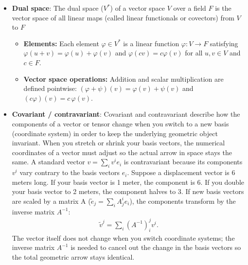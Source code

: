\documentclass{report}
\begin{document}
\begin{itemize}
            \[
                g'_{11}=g(2\mathbf e_1,2\mathbf e_1)=4g_{11}.
            \]
            The order counts the slots, and the dimension tells you how many choices each slot has. So an order-2 tensor has \(2^2=4\) entries in 2D and \(3^2=9\) entries in 3D.
        \item \textbf{Dual space}: The dual space (\(V^{*}\)) of a vector space \(V\) over a field \(F\) is the vector space of all linear maps (called linear functionals or covectors) from \(V\) to \(F\)
            \begin{itemize}
                \item \textbf{Elements:} Each element \(\varphi \in V^*\) is a linear function \(\varphi: V \to F\) satisfying \(\varphi(u + v) = \varphi(u) + \varphi(v)\) and \(\varphi(c v) = c \varphi(v)\) for all \(u, v \in V\) and \(c \in F\).
                \item \textbf{Vector space operations:} Addition and scalar multiplication are defined pointwise: \((\varphi + \psi)(v) = \varphi(v) + \psi(v)\) and \((c\varphi)(v) = c\,\varphi(v)\).
            \end{itemize}
        \item \textbf{Covariant / contravariant}: Covariant and contravariant describe how the components of a vector or tensor change when you switch to a new basis (coordinate system) in order to keep the underlying geometric object invariant. When you stretch or shrink your basis vectors, the numerical coordinates of a vector must adjust so the actual arrow in space stays the same.
            \bigbreak \noindent 
            A standard vector \(v = \sum_i v^i e_i\) is contravariant because its components \(v^{i}\) vary contrary to the basis vectors \(e_{i}\).
            \bigbreak \noindent 
            Suppose a displacement vector is 6 meters long. If your basis vector is 1 meter, the component is 6. If you double your basis vector to 2 meters, the component halves to 3.
            \bigbreak \noindent 
            If new basis vectors are scaled by a matrix A (\(\tilde{e}_j = \sum_i A^i_j e_i\)), the components transform by the inverse matrix $A^{-1}$:
            \begin{align*}
                \tilde{v}^{j}=\sum _{i}(A^{-1})_{i}^{j}v^{i}
            .\end{align*}
            The vector itself does not change when you switch coordinate systems; the inverse matrix \(A^{-1}\) is needed to cancel out the change in the basis vectors so the total geometric arrow stays identical.
            \bigbreak \noindent 

\end{itemize}
\end{document}

